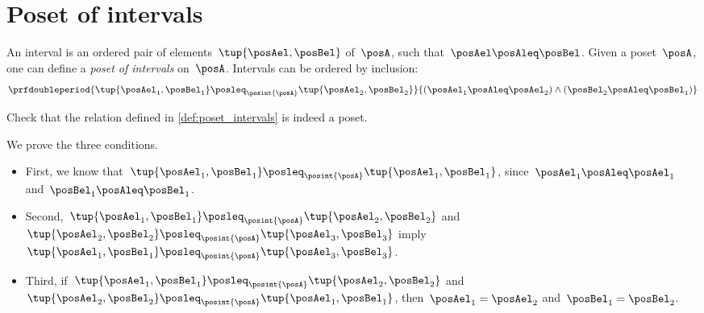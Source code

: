 
\section{Poset of intervals}
\begin{definition}
    \label{def:poset_intervals}
    An interval is an ordered pair of elements~$\tup{\posAel,\posBel}$ of~$\posA$, such that~$\posAel \posAleq \posBel$.
    Given a poset~$\posA$, one can define a \emph{poset of intervals} on~$\posA$.
    Intervals can be ordered by inclusion:
    \begin{equation}
        \prfdoubleperiod{\tup{\posAel_1,\posBel_1}\posleq_{\posint{\posA}}\tup{\posAel_2,\posBel_2} }{ (\posAel_1\posAleq \posAel_2)\wedge (\posBel_2\posAleq \posBel_1)}
    \end{equation}
\end{definition}

\begin{exercise}
    Check that the relation defined in \cref{def:poset_intervals} is indeed a poset.
\end{exercise}
\begin{solution}
    We prove the three conditions.
    \begin{itemize}
        \item First, we know that~$\tup{\posAel_1,\posBel_1}\posleq_{\posint{\posA}}\tup{\posAel_1,\posBel_1}$, since~$\posAel_1\posAleq \posAel_1$ and~$\posBel_1\posAleq \posBel_1$.
        \item Second,~$\tup{\posAel_1,\posBel_1}\posleq_{\posint{\posA}}\tup{\posAel_2,\posBel_2}$ and~$\tup{\posAel_2,\posBel_2}\posleq_{\posint{\posA}}\tup{\posAel_3,\posBel_3}$ imply~$\tup{\posAel_1,\posBel_1}\posleq_{\posint{\posA}}\tup{\posAel_3,\posBel_3}$.
        \item Third, if~$\tup{\posAel_1,\posBel_1}\posleq_{\posint{\posA}}\tup{\posAel_2,\posBel_2}$ and~$\tup{\posAel_2,\posBel_2}\posleq_{\posint{\posA}}\tup{\posAel_1,\posBel_1}$, then~$\posAel_1=\posAel_2$ and~$\posBel_1=\posBel_2$.
    \end{itemize}
\end{solution}
